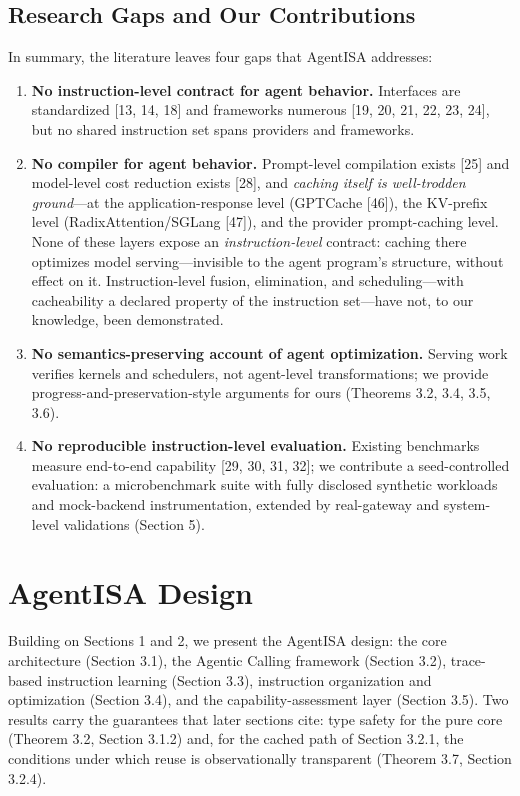 \documentclass[
  sigconf,
  anonymous]{acmart}
\begin{document}
\subsection{Research Gaps and Our
Contributions}\label{research-gaps-and-our-contributions}

In summary, the literature leaves four gaps that AgentISA addresses:

\begin{enumerate}
\def\labelenumi{\arabic{enumi}.}
\item
  \textbf{No instruction-level contract for agent behavior.} Interfaces
  are standardized {[}13, 14, 18{]} and frameworks numerous {[}19, 20,
  21, 22, 23, 24{]}, but no shared instruction set spans providers and
  frameworks.
\item
  \textbf{No compiler for agent behavior.} Prompt-level compilation
  exists {[}25{]} and model-level cost reduction exists {[}28{]}, and
  \emph{caching itself is well-trodden ground}---at the
  application-response level (GPTCache {[}46{]}), the KV-prefix level
  (RadixAttention/SGLang {[}47{]}), and the provider prompt-caching
  level. None of these layers expose an \emph{instruction-level}
  contract: caching there optimizes model serving---invisible to the
  agent program's structure, without effect on it. Instruction-level
  fusion, elimination, and scheduling---with cacheability a declared
  property of the instruction set---have not, to our knowledge, been
  demonstrated.
\item
  \textbf{No semantics-preserving account of agent optimization.}
  Serving work verifies kernels and schedulers, not agent-level
  transformations; we provide progress-and-preservation-style arguments
  for ours (Theorems 3.2, 3.4, 3.5, 3.6).
\item
  \textbf{No reproducible instruction-level evaluation.} Existing
  benchmarks measure end-to-end capability {[}29, 30, 31, 32{]}; we
  contribute a seed-controlled evaluation: a microbenchmark suite with
  fully disclosed synthetic workloads and mock-backend instrumentation,
  extended by real-gateway and system-level validations (Section 5).
\end{enumerate}

\section{AgentISA Design}\label{agentisa-design}

Building on Sections 1 and 2, we present the AgentISA design: the core
architecture (Section 3.1), the Agentic Calling framework (Section 3.2),
trace-based instruction learning (Section 3.3), instruction organization
and optimization (Section 3.4), and the capability-assessment layer
(Section 3.5). Two results carry the guarantees that later sections
cite: type safety for the pure core (Theorem 3.2, Section 3.1.2) and,
for the cached path of Section 3.2.1, the conditions under which reuse
is observationally transparent (Theorem 3.7, Section 3.2.4).
\end{document}
